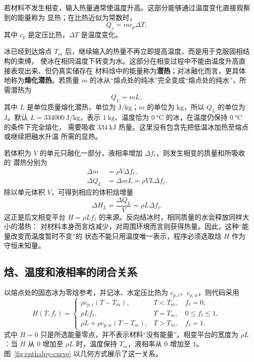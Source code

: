 \documentclass[UTF8,11pt]{ctexart}
\numberwithin{equation}{section}
\newcommand{\fl}{f_{\ell}}
\begin{document}
若材料不发生相变，输入热量通常使温度升高。这部分能够通过温度变化直接观察到的能量称为
显热；在比热近似为常数时，
\begin{equation}
      Q_s=mc_p\Delta T,
      \label{eq:sensible-heat}
\end{equation}
其中 $c_p$ 是定压比热，$\Delta T$ 是温度变化。

冰已经到达熔点 $T_m$ 后，继续输入的热量不再立即提高温度，而是用于克服固相结构的束缚，
使冰在相同温度下转变为水。这部分在相变过程中不能由温度升高直接表现出来、但仍真实储存在
材料焓中的能量称为\textbf{潜热}；对冰融化而言，更具体地称为\textbf{熔化潜热}。若质量
$m$ 的冰从“熔点处的纯冰”完全变成“熔点处的纯水”，所需潜热为
\begin{equation}
      Q_L=mL,
      \label{eq:latent-heat}
\end{equation}
其中 $L$ 是单位质量熔化潜热，单位为 $\si{\joule\per\kilogram}$；$m$ 的单位为
$\si{\kilogram}$，所以 $Q_L$ 的单位为 $\si{\joule}$。默认
$L=\SI{334000}{\joule\per\kilogram}$，表示 $\SI{1}{\kilogram}$、温度恰为
$\SI{0}{\degreeCelsius}$ 的冰，在温度仍保持 $\SI{0}{\degreeCelsius}$ 的条件下完全熔化，
需要吸收 $\SI{334}{\kilo\joule}$ 热量。这里没有包含先把低温冰加热至熔点或继续把融水升温
所需的显热。

若体积为 $V$ 的单元只融化一部分，液相率增加 $\Delta\fl$，则发生相变的质量和所吸收的
潜热分别为
\begin{align}
      \Delta m&=\rho V\Delta\fl,\\
      \Delta Q_L&=\Delta mL
      =\rho VL\Delta\fl.
      \label{eq:partial-latent-heat}
\end{align}
除以单元体积 $V$，可得到相应的体积焓增量
\begin{equation}
      \Delta H_L=\frac{\Delta Q_L}{V}
      =\rho L\Delta\fl.
      \label{eq:volumetric-latent-heat}
\end{equation}
这正是后文相变平台 $H=\rho L\fl$ 的来源。反向结冰时，相同质量的水会释放同样大小的潜热：
对材料本身而言焓减少，对周围环境而言则获得热量。因此，这种“能量改变而温度暂时不变”的
状态不能只用温度唯一表示，程序必须选取焓 $H$ 作为守恒未知量。

\subsection{焓、温度和液相率的闭合关系}

以熔点处的固态冰为零焓参考，并记冰、水定压比热为 $c_{p,i}$、$c_{p,w}$，则代码采用
\begin{equation}
      H(T,\fl)=
      \begin{cases}
            \rho c_{p,i}(T-T_m),
            & T<T_m,\quad \fl=0,\\[2mm]
            \rho L\fl,
            & T=T_m,\quad 0\le\fl\le1,\\[2mm]
            \rho L+\rho c_{p,w}(T-T_m),
            & T>T_m,\quad \fl=1.
      \end{cases}
      \label{eq:enthalpy-definition}
\end{equation}
式中 $H=0$ 只是所选能量零点，并不表示材料“没有能量”。相变平台的宽度为
$\rho L$：当 $H$ 从 $0$ 增加至 $\rho L$ 时，温度保持 $T_m$，液相率从 $0$ 增加至 $1$。
图~\ref{fig:enthalpy-curve} 以几何方式展示了这一关系。
\end{document}
